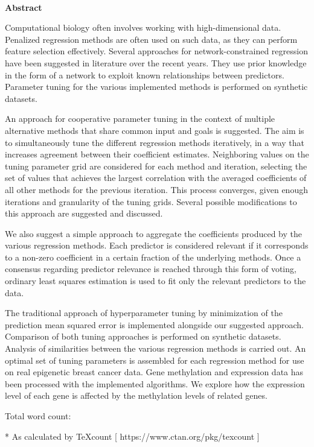 \newpage
\begin{center}
	\LARGE
	\dissertationtitle \\
\end{center}

{\Huge \bf Abstract}
\vspace{24pt} 

Computational biology often involves working with high-dimensional data. Penalized regression methods are often used on such data, as they can perform feature selection effectively. Several approaches for network-constrained regression have been suggested in literature over the recent years. They use prior knowledge in the form of a network to exploit known relationships between predictors. Parameter tuning for the various implemented methods is performed on synthetic datasets. 

An approach for cooperative parameter tuning in the context of multiple alternative methods that share common input and goals is suggested. The aim is to simultaneously tune the different regression methods iteratively, in a way that increases agreement between their coefficient estimates. Neighboring values on the tuning parameter grid are considered for each method and iteration, selecting the set of values that achieves the largest correlation with the averaged coefficients of all other methods for the previous iteration. This process converges, given enough iterations and granularity of the tuning grids. Several possible modifications to this approach are suggested and discussed.

We also suggest a simple approach to aggregate the coefficients produced by the various regression methods. Each predictor is considered relevant if it corresponds to a non-zero coefficient in a certain fraction of the underlying methods. Once a consensus regarding predictor relevance is reached through this form of voting, ordinary least squares estimation is used to fit only the relevant predictors to the data.

The traditional approach of hyperparameter tuning by minimization of the prediction mean squared error is implemented alongside our suggested approach. Comparison of both tuning approaches is performed on synthetic datasets. Analysis of similarities between the various regression methods is carried out. An optimal set of tuning parameters is assembled for each regression method for use on real epigenetic breast cancer data. Gene methylation and expression data has been processed with the implemented algorithms. We explore how the expression level of each gene is affected by the methylation levels of related genes.

\newpage
Total word count: \wordcount

* As calculated by TeXcount [ https://www.ctan.org/pkg/texcount ]
\vspace*{\fill}
